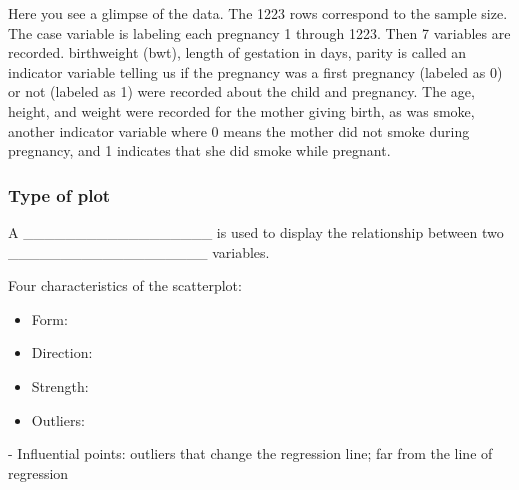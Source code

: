 \documentclass[
]{report}
\providecommand{\tightlist}{%
  \setlength{\itemsep}{0pt}\setlength{\parskip}{0pt}}
\newcommand{\rgi}{\hspace{24pt}}  %
\begin{document}
Here you see a glimpse of the data. The 1223 rows correspond to the sample size. The case variable is labeling each pregnancy 1 through 1223. Then 7 variables are recorded. birthweight (bwt), length of gestation in days, parity is called an indicator variable telling us if the pregnancy was a first pregnancy (labeled as 0) or not (labeled as 1) were recorded about the child and pregnancy. The age, height, and weight were recorded for the mother giving birth, as was smoke, another indicator variable where 0 means the mother did not smoke during pregnancy, and 1 indicates that she did smoke while pregnant.


\subsubsection*{Type of plot}\label{type-of-plot}

A \_\_\_\_\_\_\_\_\_\_\_\_\_\_\_\_\_\_ is used to display the relationship
between two \_\_\_\_\_\_\_\_\_\_\_\_\_\_\_\_\_\_\_ variables.

\newpage

Four characteristics of the scatterplot:

\begin{itemize}
\tightlist
\item
  Form:
\end{itemize}

\vspace{0.2in}

\begin{itemize}
\tightlist
\item
  Direction:
\end{itemize}

\vspace{0.2in}

\begin{itemize}
\tightlist
\item
  Strength:
\end{itemize}

\vspace{0.2in}

\begin{itemize}
\tightlist
\item
  Outliers:
\end{itemize}

\vspace{0.2in}

\rgi \rgi - Influential points: outliers that change the regression line; far from the line of regression
\end{document}
